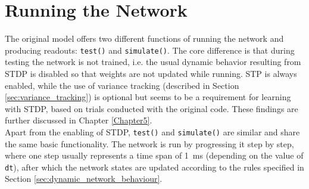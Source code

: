 \section{Running the Network} \label{sec:running_the_network}
The original model offers two different functions of running the network and producing readouts: \texttt{test()} and \texttt{simulate()}. The core difference is that during testing the network is not trained, i.e. the usual dynamic behavior resulting from STDP is disabled so that weights are not updated while running. STP is always enabled, while the use of variance tracking (described in Section \ref{sec:variance_tracking}) is optional but seems to be a requirement for learning with STDP, based on trials conducted with the original code. These findings are further discussed in Chapter \ref{Chapter5}.\\
Apart from the enabling of STDP, \texttt{test()} and \texttt{simulate()} are similar and share the same basic functionality. The network is run by progressing it step by step, where one step usually represents a time span of \SI{1}{\ms} (depending on the value of \texttt{dt}), after which the network states are updated according to the rules specified in Section \ref{sec:dynamic_network_behaviour}.

